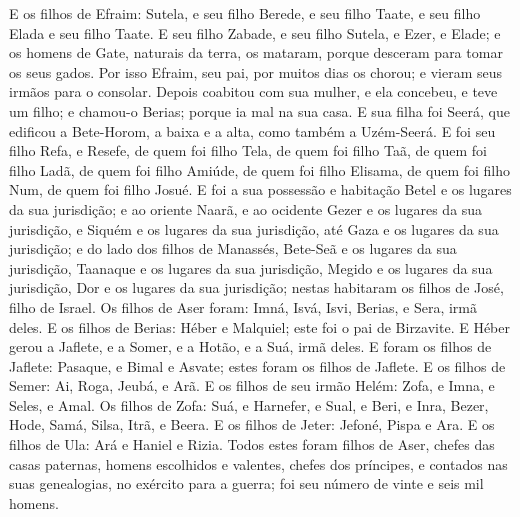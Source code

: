 E os filhos de Efraim: Sutela, e seu filho Berede, e seu filho
Taate, e seu filho Elada e seu filho Taate. E seu filho
Zabade, e seu filho Sutela, e Ezer, e Elade; e os homens de Gate,
naturais da terra, os mataram, porque desceram para tomar os seus
gados. Por isso Efraim, seu pai, por muitos dias os chorou; e
vieram seus irmãos para o consolar. Depois coabitou com sua
mulher, e ela concebeu, e teve um filho; e chamou-o Berias; porque
ia mal na sua casa. E sua filha foi Seerá, que edificou a
Bete-Horom, a baixa e a alta, como também a Uzém-Seerá. E foi
seu filho Refa, e Resefe, de quem foi filho Tela, de quem foi filho
Taã, de quem foi filho Ladã, de quem foi filho Amiúde, de
quem foi filho Elisama, de quem foi filho Num, de quem foi
filho Josué. E foi a sua possessão e habitação Betel e os
lugares da sua jurisdição; e ao oriente Naarã, e ao ocidente Gezer e
os lugares da sua jurisdição, e Siquém e os lugares da sua
jurisdição, até Gaza e os lugares da sua jurisdição; e do
lado dos filhos de Manassés, Bete-Seã e os lugares da sua
jurisdição, Taanaque e os lugares da sua jurisdição, Megido e os
lugares da sua jurisdição, Dor e os lugares da sua jurisdição;
nestas habitaram os filhos de José, filho de Israel. Os
filhos de Aser foram: Imná, Isvá, Isvi, Berias, e Sera, irmã deles.
E os filhos de Berias: Héber e Malquiel; este foi o pai de
Birzavite. E Héber gerou a Jaflete, e a Somer, e a Hotão, e a
Suá, irmã deles. E foram os filhos de Jaflete: Pasaque, e
Bimal e Asvate; estes foram os filhos de Jaflete. E os filhos
de Semer: Ai, Roga, Jeubá, e Arã. E os filhos de seu irmão
Helém: Zofa, e Imna, e Seles, e Amal. Os filhos de Zofa: Suá,
e Harnefer, e Sual, e Beri, e Inra, Bezer, Hode, Samá, Silsa,
Itrã, e Beera. E os filhos de Jeter: Jefoné, Pispa e Ara.
E os filhos de Ula: Ará e Haniel e Rizia. Todos estes
foram filhos de Aser, chefes das casas paternas, homens escolhidos e
valentes, chefes dos príncipes, e contados nas suas genealogias, no
exército para a guerra; foi seu número de vinte e seis mil homens.

\medskip

